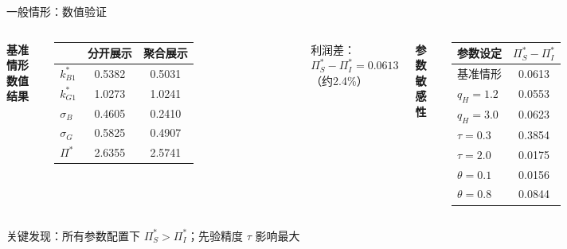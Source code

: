 \documentclass[aspectratio=169,10pt]{beamer}
\newcommand{\pos}[1]{\textcolor{positive}{#1}}
\newcommand{\HL}[1]{\textcolor{emphasis}{#1}}
\begin{document}
\begin{frame}{一般情形：数值验证}
\begin{columns}[T]
\textbf{基准情形数值结果}

\vspace{4pt}
\small
\begin{tabular}{lcc}
\toprule
& 分开展示 & 聚合展示 \\
\midrule
$k_{B1}^*$ & 0.5382 & 0.5031 \\
$k_{G1}^*$ & 1.0273 & 1.0241 \\
$\sigma_B$ & 0.4605 & 0.2410 \\
$\sigma_G$ & 0.5825 & 0.4907 \\
$\Pi^*$ & \pos{2.6355} & 2.5741 \\
\bottomrule
\end{tabular}

\vspace{6pt}
利润差：$\Pi_S^* - \Pi_I^* = 0.0613$（约2.4\%）

\textbf{参数敏感性}

\vspace{4pt}
\small
\begin{tabular}{lc}
\toprule
参数设定 & $\Pi_S^* - \Pi_I^*$ \\
\midrule
基准情形 & 0.0613 \\
$q_H = 1.2$ & 0.0553 \\
$q_H = 3.0$ & 0.0623 \\
$\tau = 0.3$ & \pos{0.3854} \\
$\tau = 2.0$ & 0.0175 \\
$\theta = 0.1$ & 0.0156 \\
$\theta = 0.8$ & 0.0844 \\
\bottomrule
\end{tabular}
\end{columns}

\vspace{8pt}
\HL{关键发现}：所有参数配置下 $\Pi_S^* > \Pi_I^*$；先验精度 $\tau$ 影响最大
\end{frame}
\end{document}
